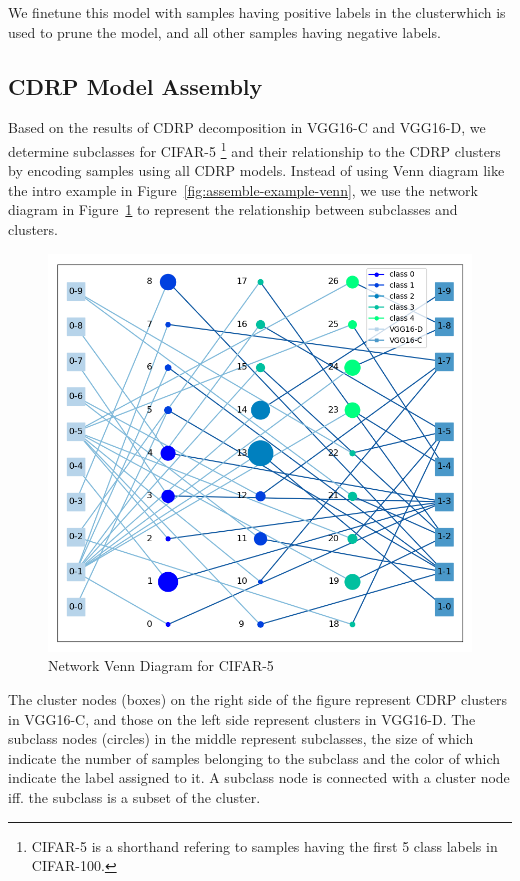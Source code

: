 \documentclass[sigplan,10pt,review]{acmart}\settopmatter{printfolios=true,printccs=false,printacmref=false}
\newcommand{\todo}[1]{\textcolor{red}{[TODO: #1]}}
\begin{document}
We finetune this model with samples having positive labels in the clusterwhich is used to prune the model, and all other samples having negative labels. 

\subsection{CDRP Model Assembly}
Based on the results of CDRP decomposition in VGG16-C and VGG16-D, we determine subclasses for CIFAR-5	\footnote{CIFAR-5 is a shorthand refering to samples having the first 5 class labels in CIFAR-100.} and their relationship to the CDRP clusters by encoding samples using all CDRP models.
Instead of using Venn diagram like the intro example in Figure~\ref{fig:assemble-example-venn}, we use the network diagram in Figure~\ref{fig:network-venn} to represent the relationship between subclasses and clusters.

\begin{figure}[h]
	\centering
	\includegraphics[width=\linewidth]{fig/network_venn.png}
	\caption{Network Venn Diagram for CIFAR-5}
	\label{fig:network-venn}
\end{figure}

The cluster nodes (boxes) on the right side of the figure represent CDRP clusters in VGG16-C, and those on the left side represent clusters in VGG16-D.
The subclass nodes (circles) in the middle represent subclasses, the size of which indicate the number of samples belonging to the subclass and the color of which indicate the label assigned to it.
A subclass node is connected with a cluster node iff. the subclass is a subset of the cluster.
\end{document}

